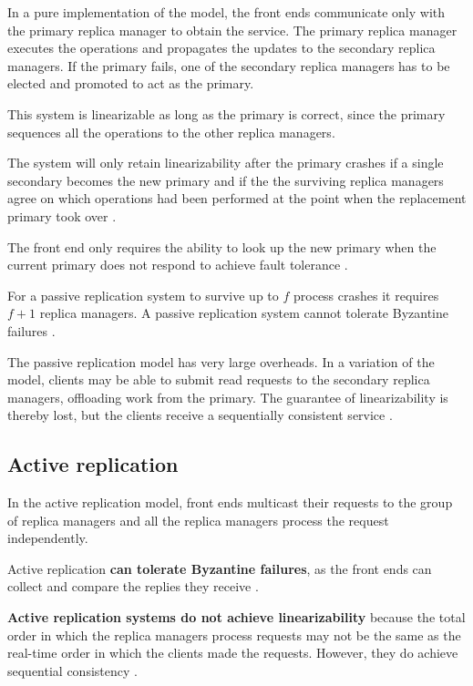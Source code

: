 \documentclass[12pt, oneside]{book}
\begin{document}
In a pure implementation of the model, the front ends communicate only with the primary replica manager to obtain the service.
The primary replica manager executes the operations and propagates the updates to the secondary replica managers.
If the primary fails, one of the secondary replica managers has to be elected and promoted to act as the primary.

This system is linearizable as long as the primary is correct, since the primary sequences all the operations to the other replica managers.

The system will only retain linearizability after the primary crashes if a single secondary becomes the new primary and if the the surviving replica managers agree on which operations had been performed at the point when the replacement primary took over \cite[p.~779]{distributed-systems-coulouris-2013}.

The front end only requires the ability to look up the new primary when the current primary does not respond to achieve fault tolerance  \cite[p.~780]{distributed-systems-coulouris-2013}.

For a passive replication system to survive up to \(f\) process crashes it requires \(f + 1\) replica managers.
A passive replication system cannot tolerate Byzantine failures \cite[p.~780]{distributed-systems-coulouris-2013}.

The passive replication model has very large overheads.
In a variation of the model, clients may be able to submit read requests to the secondary replica managers, offloading work from the primary.
The guarantee of linearizability is thereby lost, but the clients receive a sequentially consistent service \cite[p.~780]{distributed-systems-coulouris-2013}.

\subsection{Active replication}

In the active replication model, front ends multicast their requests to the group of replica managers and all the replica managers process the request independently.

Active replication \textbf{can tolerate Byzantine failures}, as the front ends can collect and compare the replies they receive \cite[p.~780]{distributed-systems-coulouris-2013}.

\textbf{Active replication systems do not achieve linearizability} because the total order in which the replica managers process requests may not be the same as the real-time order in which the clients made the requests. However, they do achieve sequential consistency \cite[p.~781]{distributed-systems-coulouris-2013}.
\end{document}

